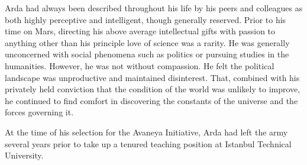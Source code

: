 Arda had always been described throughout his life by his peers and colleagues as both highly perceptive and intelligent, though generally reserved. Prior to his time on Mars, directing his above average intellectual gifts with passion to anything other than his principle love of science was a rarity. He was generally unconcerned with social phenomena such as politics or pursuing studies in the humanities. However, he was not without compassion. He felt the political landscape was unproductive and maintained disinterest. That, combined with his privately held conviction that the condition of the world was unlikely to improve, he continued to find comfort in discovering the constants of the universe and the forces governing it.

At the time of his selection for the Avaneya Initiative, Arda had left the army several years prior to take up a tenured teaching position at Istanbul Technical University.

